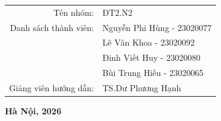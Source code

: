 \begin{titlepage}
    \vfill

    \begin{center}
        \large %
        \begin{tabular}{r l}
            Tên nhóm: & ĐT2.N2 \\[0.5cm]
            Danh sách thành viên: & Nguyễn Phi Hùng - 23020077 \\[0.3cm]
            & Lê Văn Khoa - 23020092 \\[0.3cm]
            & Đinh Viết Huy - 23020080 \\[0.3cm]
            & Bùi Trung Hiếu - 23020065 \\[0.5cm]
            Giảng viên hướng dẫn: & TS.Dư Phương Hạnh
        \end{tabular}
    \end{center}

    \vfill

    \begin{center}
        \textbf{Hà Nội, 2026}
    \end{center}
\end{titlepage}
